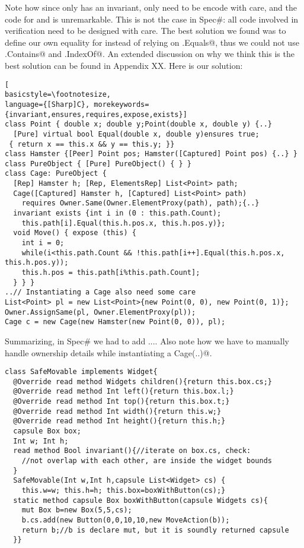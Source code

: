 Note how since only \Q@Cage@ has an invariant,
only \Q@Cage@ need to be encode with care, and the code for \Q@Point@ and \Q@Hamster@ is unremarkable.
This is not the case in Spec\#: all code involved in 
verification need to be designed with care. The best solution we found was to define our own equality for \Q@Point@ instead of relying on \Q@Object.Equals@,
thus we could not use \Q@List.Contains@ and \Q@List.IndexOf@. An extended discussion on why we think this is the best solution can be found in Appendix XX.
Here is our solution:
\begin{lstlisting}[
basicstyle=\footnotesize,
language={[Sharp]C}, morekeywords={invariant,ensures,requires,expose,exists}]
class Point { double x; double y;Point(double x, double y) {..}
  [Pure] virtual bool Equal(double x, double y)ensures true;
 { return x == this.x && y == this.y; }}
class Hamster {[Peer] Point pos; Hamster([Captured] Point pos) {..} }
class PureObject { [Pure] PureObject() { } }
class Cage: PureObject {
  [Rep] Hamster h; [Rep, ElementsRep] List<Point> path;
  Cage([Captured] Hamster h, [Captured] List<Point> path)
    requires Owner.Same(Owner.ElementProxy(path), path);{..}
  invariant exists {int i in (0 : this.path.Count);
    this.path[i].Equal(this.h.pos.x, this.h.pos.y)};
  void Move() { expose (this) {
    int i = 0;
    while(i<this.path.Count && !this.path[i++].Equal(this.h.pos.x, this.h.pos.y));
    this.h.pos = this.path[i%this.path.Count];
  } } }
..// Instantiating a Cage also need some care
List<Point> pl = new List<Point>{new Point(0, 0), new Point(0, 1)};
Owner.AssignSame(pl, Owner.ElementProxy(pl));
Cage c = new Cage(new Hamster(new Point(0, 0)), pl);

\end{lstlisting}
Summarizing, in Spec\# we had to add ....
Also note how we have to manually handle ownership details while instantiating a \Q@new Cage(..)@.
\LINE

\newpage
\begin{lstlisting}
class SafeMovable implements Widget{
  @Override read method Widgets children(){return this.box.cs;}
  @Override read method Int left(){return this.box.l;}
  @Override read method Int top(){return this.box.t;}
  @Override read method Int width(){return this.w;}
  @Override read method Int height(){return this.h;}
  capsule Box box;
  Int w; Int h;
  read method Bool invariant(){//iterate on box.cs, check:
    //not overlap with each other, are inside the widget bounds
  }
  SafeMovable(Int w,Int h,capsule List<Widget> cs) {
    this.w=w; this.h=h; this.box=boxWithButton(cs);}
  static method capsule Box boxWithButton(capsule Widgets cs){
    mut Box b=new Box(5,5,cs);
    b.cs.add(new Button(0,0,10,10,new MoveAction(b));
    return b;//b is declare mut, but it is soundly returned capsule
  }}
\end{lstlisting}

